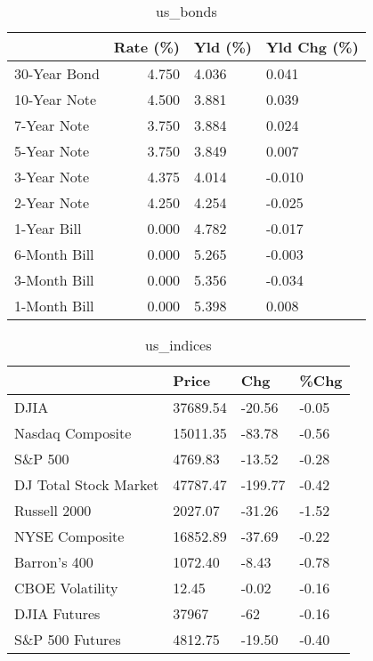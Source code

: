 \documentclass{article}%
\begin{document}
%


\begin{table}[htbp]%
\caption{us\_bonds}%
\centering%
\begin{adjustbox}{width=1\textwidth}%
\begin{tabular}{lrll}
\toprule
             &  Rate (\%) & Yld (\%) & Yld Chg (\%) \\
\midrule
30-Year Bond &     4.750 &   4.036 &       0.041 \\
10-Year Note &     4.500 &   3.881 &       0.039 \\
 7-Year Note &     3.750 &   3.884 &       0.024 \\
 5-Year Note &     3.750 &   3.849 &       0.007 \\
 3-Year Note &     4.375 &   4.014 &      -0.010 \\
 2-Year Note &     4.250 &   4.254 &      -0.025 \\
 1-Year Bill &     0.000 &   4.782 &      -0.017 \\
6-Month Bill &     0.000 &   5.265 &      -0.003 \\
3-Month Bill &     0.000 &   5.356 &      -0.034 \\
1-Month Bill &     0.000 &   5.398 &       0.008 \\
\bottomrule
\end{tabular}
%
\end{adjustbox}%
\end{table}

%


\begin{table}[htbp]%
\caption{us\_indices}%
\centering%
\begin{adjustbox}{width=1\textwidth}%
\begin{tabular}{llll}
\toprule
                      &    Price &     Chg &  \%Chg \\
\midrule
                 DJIA & 37689.54 &  -20.56 & -0.05 \\
     Nasdaq Composite & 15011.35 &  -83.78 & -0.56 \\
              S\&P 500 &  4769.83 &  -13.52 & -0.28 \\
DJ Total Stock Market & 47787.47 & -199.77 & -0.42 \\
         Russell 2000 &  2027.07 &  -31.26 & -1.52 \\
       NYSE Composite & 16852.89 &  -37.69 & -0.22 \\
         Barron's 400 &  1072.40 &   -8.43 & -0.78 \\
      CBOE Volatility &    12.45 &   -0.02 & -0.16 \\
         DJIA Futures &    37967 &     -62 & -0.16 \\
      S\&P 500 Futures &  4812.75 &  -19.50 & -0.40 \\
\bottomrule
\end{tabular}
%
\end{adjustbox}%
\end{table}
\end{document}
